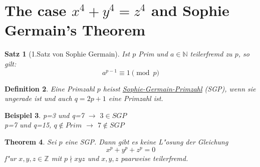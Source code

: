 \documentclass[12pt, a4paper, twoside]{article}
\newtheorem{satz}{Satz}
\newtheorem{defi}[satz]{Definition}
\newtheorem{bsp}[satz]{Beispiel}
\newtheorem{thm}[satz]{Theorem}
\numberwithin{equation}{section}
\begin{document}
\section{The case $x^4+y^4=z^4$ and Sophie Germain's Theorem}
\begin{satz}[1.Satz von Sophie Germain]
Ist $p$ Prim und $a \in \mathbb{N}$ teilerfremd zu $p$, so gilt:\\
$$a^{p-1} \equiv 1 \pmod  p$$
\end{satz}
\begin{defi}
Eine Primzahl $p$ heisst \underline{Sophie-Germain-Primzahl} (SGP), wenn sie ungerade ist und auch $q=2p+1$ eine Primzahl ist.
\end{defi}
\begin{bsp}
p=3 und q=7 $\rightarrow$ $3 \in SGP$\\
p=7 und q=15, $q \notin Prim$ $\rightarrow$ $7 \notin SGP$
\end{bsp}
\begin{thm}
Sei $p$  eine SGP. Dann gibt es keine L"osung der Gleichung $$x^p+y^p+z^p=0$$ f"ur $x,y,z \in\mathbb{Z}$ mit $p\nmid xyz$ und $x,y,z$ paarweise teilerfremd.
\end{thm}
\end{document}

